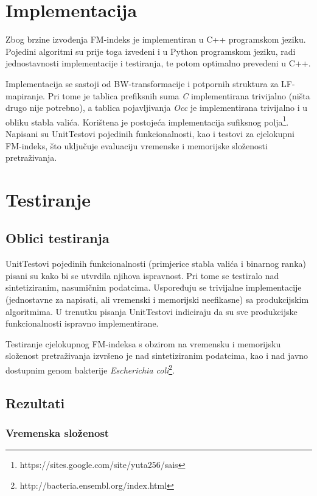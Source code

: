 \documentclass[times, utf8, seminar, numeric]{fer}
\begin{document}
\section{Implementacija}

Zbog brzine izvođenja FM-indeks je implementiran u C++ programskom jeziku.
Pojedini algoritmi su prije toga izvedeni i u Python programskom jeziku, radi
jednostavnosti implementacije i testiranja, te potom optimalno prevedeni u
C++.

Implementacija se sastoji od BW-transformacije i potpornih struktura za LF-mapiranje.
Pri tome je tablica prefiksnih suma \textit{C} implementirana trivijalno (ništa
drugo nije potrebno), a tablica pojavljivanja \textit{Occ} je implementirana
trivijalno i u obliku stabla valića. Korištena je postojeća implementacija sufiksnog
polja\footnote{https://sites.google.com/site/yuta256/sais}. Napisani su UnitTestovi
pojedinih funkcionalnosti, kao i testovi za cjelokupni FM-indeks, što uključuje
evaluaciju vremenske i memorijske složenosti pretraživanja.

\section{Testiranje}

\subsection{Oblici testiranja}

UnitTestovi pojedinih funkcionalnosti (primjerice stabla valića i binarnog ranka) pisani su
kako bi se utvrdila njihova ispravnost. Pri tome se testiralo nad sintetiziranim,
nasumičnim podatcima. Uspoređuju se trivijalne implementacije (jednostavne za napisati,
ali vremenski i memorijski neefikasne) sa produkcijskim algoritmima. U trenutku pisanja
UnitTestovi indiciraju da su sve produkcijske funkcionalnosti ispravno implementirane.

Testiranje cjelokupnog FM-indeksa s obzirom na vremensku i memorijsku složenost
pretraživanja izvršeno je nad sintetiziranim podatcima, kao i nad 
javno dostupnim genom bakterije \textit{Escherichia coli}\footnote{http://bacteria.ensembl.org/index.html}.

\subsection{Rezultati}

\subsubsection{Vremenska složenost}
\end{document}
